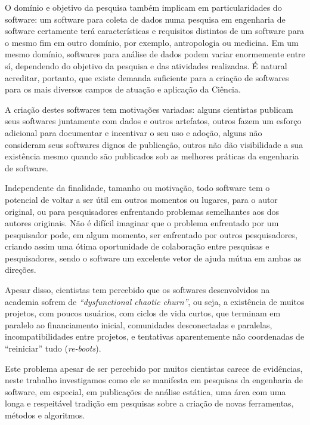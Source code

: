 O domínio e objetivo da pesquisa também implicam em particularidades do software: 
um software para coleta de dados numa pesquisa em engenharia de
software certamente terá características e requisitos distintos de um software
para o mesmo fim em outro domínio, por exemplo,  antropologia ou medicina.
Em um mesmo domínio, softwares para análise de dados podem variar
enormemente entre sí, dependendo do objetivo da pesquisa e das atividades realizadas.
\'{E} natural acreditar, portanto, que existe demanda suficiente para a
criação de softwares para os mais diversos campos de atuação e aplicação da
Ciência.

A criação destes softwares tem motivações variadas:  alguns cientistas publicam
seus softwares juntamente com dados e outros artefatos, outros fazem um esforço
adicional para documentar e incentivar o seu uso e adoção, alguns não
consideram seus softwares dignos de publicação, outros não dão visibilidade a
sua existência mesmo quando são publicados sob as melhores práticas da
engenharia de software.

Independente da finalidade, tamanho ou motivação, todo software tem o potencial
de voltar a ser útil em outros momentos ou lugares, para o autor original,
ou para pesquisadores enfrentando problemas semelhantes aos dos autores originais.
Não é difícil imaginar que o problema enfrentado por um pesquisador pode, em
algum momento, ser enfrentado por outros pesquisadores, criando assim uma ótima
oportunidade de colaboração entre pesquisas e pesquisadores, sendo o software
um excelente vetor de ajuda mútua em ambas as direções.

Apesar disso, cientistas tem percebido que os softwares desenvolvidos na
academia sofrem de {\it ``dysfunctional chaotic churn''}, ou seja, a existência
de muitos projetos, com poucos usuários, com ciclos de vida curtos, que
terminam em paralelo ao financiamento inicial, comunidades desconectadas e
paralelas, incompatibilidades entre projetos, e tentativas aparentemente não
coordenadas de ``reiniciar'' tudo ({\it re-boots}).


Este problema apesar de ser percebido por muitos cientistas carece de
evidências, neste trabalho investigamos como ele se manifesta em pesquisas da
engenharia de software, em especial, em publicações de análise estática, uma
área com uma longa e respeitável tradição em pesquisas sobre a criação de novas
ferramentas, métodos e algoritmos.

